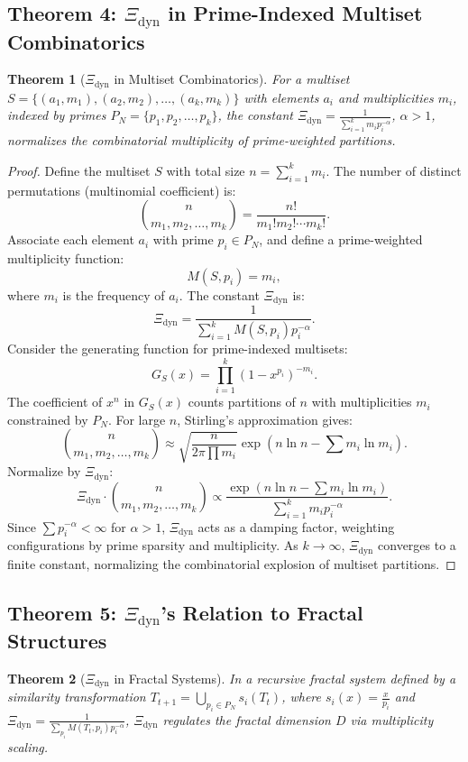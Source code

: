 \documentclass[12pt]{article}
\newtheorem{theorem}{Theorem}[section]
\begin{document}
\subsection{Theorem 4: $\Xi_{\text{dyn}}$ in Prime-Indexed Multiset Combinatorics}
\begin{theorem}[$\Xi_{\text{dyn}}$ in Multiset Combinatorics]
For a multiset \( S = \{ (a_1, m_1), (a_2, m_2), \ldots, (a_k, m_k) \} \) with elements \( a_i \) and multiplicities \( m_i \), indexed by primes \( P_N = \{ p_1, p_2, \ldots, p_k \} \), the constant $\Xi_{\text{dyn}} = \frac{1}{\sum_{i=1}^k m_i p_i^{-\alpha}}$, \(\alpha > 1\), normalizes the combinatorial multiplicity of prime-weighted partitions.
\end{theorem}

\begin{proof}
Define the multiset \( S \) with total size \( n = \sum_{i=1}^k m_i \). The number of distinct permutations (multinomial coefficient) is:
\[
\binom{n}{m_1, m_2, \ldots, m_k} = \frac{n!}{m_1! m_2! \cdots m_k!}.
\]
Associate each element \( a_i \) with prime \( p_i \in P_N \), and define a prime-weighted multiplicity function:
\[
M(S, p_i) = m_i,
\]
where \( m_i \) is the frequency of \( a_i \). The constant $\Xi_{\text{dyn}}$ is:
\[
\Xi_{\text{dyn}} = \frac{1}{\sum_{i=1}^k M(S, p_i) p_i^{-\alpha}}.
\]
Consider the generating function for prime-indexed multisets:
\[
G_S(x) = \prod_{i=1}^k \left( 1 - x^{p_i} \right)^{-m_i}.
\]
The coefficient of \( x^n \) in \( G_S(x) \) counts partitions of \( n \) with multiplicities \( m_i \) constrained by \( P_N \). For large \( n \), Stirling’s approximation gives:
\[
\binom{n}{m_1, m_2, \ldots, m_k} \approx \sqrt{\frac{n}{2\pi \prod m_i}} \exp\left( n \ln n - \sum m_i \ln m_i \right).
\]
Normalize by $\Xi_{\text{dyn}}$:
\[
\Xi_{\text{dyn}} \cdot \binom{n}{m_1, m_2, \ldots, m_k} \propto \frac{\exp\left( n \ln n - \sum m_i \ln m_i \right)}{\sum_{i=1}^k m_i p_i^{-\alpha}}.
\]
Since \(\sum p_i^{-\alpha} < \infty\) for \(\alpha > 1\), $\Xi_{\text{dyn}}$ acts as a damping factor, weighting configurations by prime sparsity and multiplicity. As \( k \to \infty \), $\Xi_{\text{dyn}}$ converges to a finite constant, normalizing the combinatorial explosion of multiset partitions.
\end{proof}

\subsection{Theorem 5: $\Xi_{\text{dyn}}$'s Relation to Fractal Structures}
\begin{theorem}[$\Xi_{\text{dyn}}$ in Fractal Systems]
In a recursive fractal system defined by a similarity transformation \( T_{t+1} = \bigcup_{p_i \in P_N} s_i(T_t) \), where \( s_i(x) = \frac{x}{p_i} \) and $\Xi_{\text{dyn}} = \frac{1}{\sum_{p_i} M(T_t, p_i) p_i^{-\alpha}}$, $\Xi_{\text{dyn}}$ regulates the fractal dimension \( D \) via multiplicity scaling.
\end{theorem}
\end{document}
